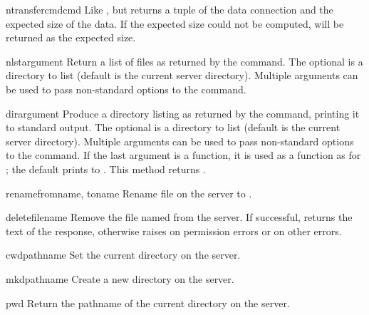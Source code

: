 \begin{methoddesc}{ntransfercmd}{cmd}
Like , but returns a tuple of the data
connection and the expected size of the data.  If the expected size
could not be computed,  will be returned as the expected
size.
\end{methoddesc}

\begin{methoddesc}{nlst}{argument\optional{, \ldots}}
Return a list of files as returned by the  command.  The
optional  is a directory to list (default is the current
server directory).  Multiple arguments can be used to pass
non-standard options to the  command.
\end{methoddesc}

\begin{methoddesc}{dir}{argument\optional{, \ldots}}
Produce a directory listing as returned by the  command,
printing it to standard output.  The optional  is a
directory to list (default is the current server directory).  Multiple
arguments can be used to pass non-standard options to the 
command.  If the last argument is a function, it is used as a
 function as for ; the default
prints to .  This method returns .
\end{methoddesc}

\begin{methoddesc}{rename}{fromname, toname}
Rename file  on the server to .
\end{methoddesc}

\begin{methoddesc}{delete}{filename}
Remove the file named  from the server.  If successful,
returns the text of the response, otherwise raises
 on permission errors or
 on other errors.
\end{methoddesc}

\begin{methoddesc}{cwd}{pathname}
Set the current directory on the server.
\end{methoddesc}

\begin{methoddesc}{mkd}{pathname}
Create a new directory on the server.
\end{methoddesc}

\begin{methoddesc}{pwd}{}
Return the pathname of the current directory on the server.
\end{methoddesc}

